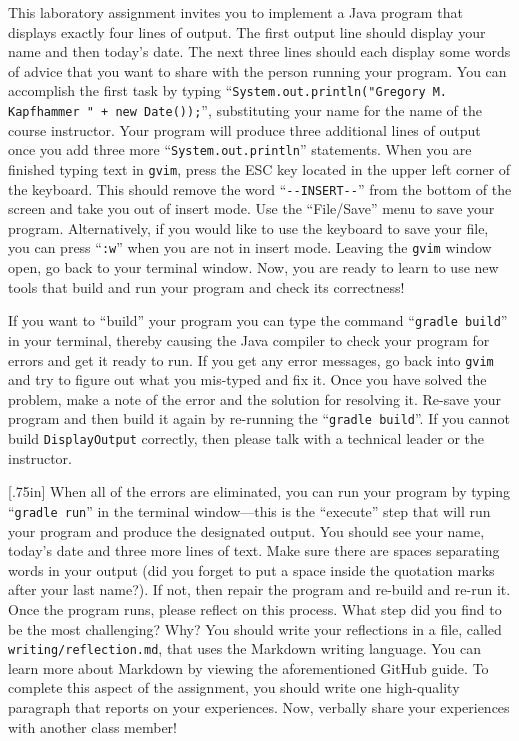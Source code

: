 \documentclass[11pt]{article}
\newcommand{\mainprogram}{\lstinline{DisplayOutput}}
\newcommand{\reflection}{\lstinline{writing/reflection.md}}
\newcommand{\gradlebuild}{\command{gradle build}}
\newcommand{\gradlerun}{\command{gradle run}}
\newcommand{\command}[1]{``\lstinline{#1}''}
\newcommand{\program}[1]{\lstinline{#1}}
\newcommand{\option}[1]{``{#1}''}
\newcommand{\step}[1]{``{#1}''}
\newcommand{\think}[1]{\null\hfill\LARGE{\faCogs{}}\newline\scriptsize{\em{#1}}}
\begin{document}
This laboratory assignment invites you to implement a Java program that
displays exactly four lines of output. The first output line should display
your name and then today's date. The next three lines should each display some
words of advice that you want to share with the person running your program.
You can accomplish the first task by typing
\command{System.out.println("Gregory M. Kapfhammer " + new Date());},
substituting your name for the name of the course instructor. Your program will
produce three additional lines of output once you add three more
\command{System.out.println} statements. When you are finished typing text in
\program{gvim}, press the ESC key located in the upper left corner of the
keyboard. This should remove the word \command{--INSERT--} from the bottom of
the screen and take you out of insert mode. Use the \option{File/Save} menu to
save your program. Alternatively, if you would like to use the keyboard to save
your file, you can press \command{:w} when you are not in insert mode. Leaving
the {\tt gvim} window open, go back to your terminal window. Now, you are ready
to learn to use new tools that build and run your program and check its
correctness!

If you want to \step{build} your program you can type the command \gradlebuild{}
in your terminal, thereby causing the Java compiler to check your program for
errors and get it ready to run. If you get any error messages, go back into
\program{gvim} and try to figure out what you mis-typed and fix it. Once you
have solved the problem, make a note of the error and the solution for resolving
it. Re-save your program and then build it again by re-running the
\gradlebuild{}. If you cannot build \mainprogram{} correctly, then please talk
with a technical leader or the instructor.

\marginnote{\think{Reflect on challenges}}[.75in] When all of the errors are
eliminated, you can run your program by typing \gradlerun{} in the terminal
window---this is the ``execute'' step that will run your program and produce
the designated output. You should see your name, today's date and three more
lines of text. Make sure there are spaces separating words in your output (did
you forget to put a space inside the quotation marks after your last name?). If
not, then repair the program and re-build and re-run it. Once the program runs,
please reflect on this process. What step did you find to be the most
challenging? Why? You should write your reflections in a file, called
\reflection{}, that uses the Markdown writing language. You can learn more
about Markdown by viewing the aforementioned GitHub guide. To complete this
aspect of the assignment, you should write one high-quality paragraph that
reports on your experiences. Now, verbally share your experiences with another
class member!
\end{document}
